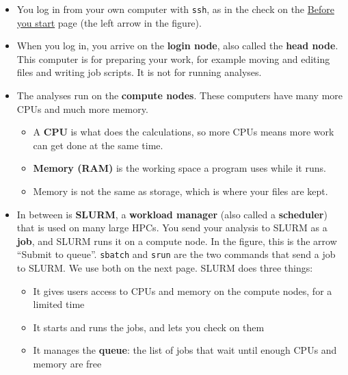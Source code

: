 \documentclass[
  letterpaper,
  DIV=11,
  numbers=noendperiod]{scrreprt}
\providecommand{\tightlist}{%
  \setlength{\itemsep}{0pt}\setlength{\parskip}{0pt}}
\begin{document}
\begin{itemize}
\tightlist
\item
  You log in from your own computer with \texttt{ssh}, as in the check
  on the \href{installation.qmd}{Before you start} page (the left arrow
  in the figure).
\item
  When you log in, you arrive on the \textbf{login node}, also called
  the \textbf{head node}. This computer is for preparing your work, for
  example moving and editing files and writing job scripts. It is not
  for running analyses.
\item
  The analyses run on the \textbf{compute nodes}. These computers have
  many more CPUs and much more memory.

  \begin{itemize}
  \tightlist
  \item
    A \textbf{CPU} is what does the calculations, so more CPUs means
    more work can get done at the same time.
  \item
    \textbf{Memory (RAM)} is the working space a program uses while it
    runs.
  \item
    Memory is not the same as storage, which is where your files are
    kept.
  \end{itemize}
\item
  In between is \textbf{SLURM}, a \textbf{workload manager} (also called
  a \textbf{scheduler}) that is used on many large HPCs. You send your
  analysis to SLURM as a \textbf{job}, and SLURM runs it on a compute
  node. In the figure, this is the arrow ``Submit to queue''.
  \texttt{sbatch} and \texttt{srun} are the two commands that send a job
  to SLURM. We use both on the next page. SLURM does three things:

  \begin{itemize}
  \tightlist
  \item
    It gives users access to CPUs and memory on the compute nodes, for a
    limited time
  \item
    It starts and runs the jobs, and lets you check on them
  \item
    It manages the \textbf{queue}: the list of jobs that wait until
    enough CPUs and memory are free
  \end{itemize}
\end{itemize}
\end{document}
